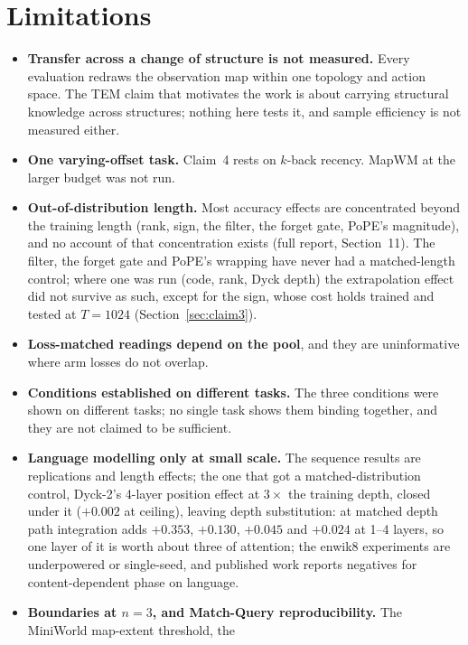 \documentclass[10pt]{article}
\begin{document}
\section{Limitations}
\label{sec:limits}

\begin{itemize}
\item \textbf{Transfer across a change of structure is not measured.} Every evaluation redraws the observation map
within one topology and action space. The TEM claim that motivates the work is about carrying structural knowledge
across structures; nothing here tests it, and sample efficiency is not measured either.
\item \textbf{One varying-offset task.} Claim~4 rests on $k$-back recency. MapWM at the larger budget was not run.
\item \textbf{Out-of-distribution length.} Most accuracy effects are concentrated beyond the training length (rank,
sign, the filter, the forget gate, PoPE's magnitude), and no account of that concentration exists (full report,
Section~11). The filter, the forget gate and PoPE's wrapping have never had a matched-length control;
where one was run (code, rank, Dyck depth) the extrapolation effect did not survive as such, except for the sign,
whose cost holds trained and tested at $T=1024$ (Section~\ref{sec:claim3}).
\item \textbf{Loss-matched readings depend on the pool}, and they are uninformative where arm losses do not overlap.
\item \textbf{Conditions established on different tasks.} The three conditions were shown on different tasks; no
single task shows them binding together, and they are not claimed to be sufficient.
\item \textbf{Language modelling only at small scale.} The sequence results are replications and length effects;
the one that got a matched-distribution control, Dyck-2's 4-layer position effect at $3\times$ the training depth,
closed under it ($+0.002$ at ceiling), leaving depth substitution: at matched depth path integration adds
$+0.353$, $+0.130$, $+0.045$ and $+0.024$ at 1--4 layers, so one layer of it is worth about three of attention;
the enwik8 experiments are underpowered or single-seed, and published work reports negatives for
content-dependent phase on language.
\item \textbf{Boundaries at $n=3$, and Match-Query reproducibility.} The MiniWorld map-extent threshold, the

\end{itemize}
\end{document}
